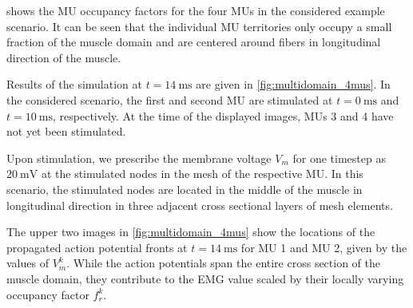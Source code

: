  shows the MU occupancy factors for the four MUs in the considered example scenario. It can be seen that the individual MU territories only occupy a small fraction of the muscle domain and are centered around fibers in longitudinal direction of the muscle.

Results of the simulation at $t=\SI{14}{\ms}$ are given in \cref{fig:multidomain_4mus}. In the considered scenario, the first and second MU are stimulated at $t=\SI{0}{\ms}$ and $t=\SI{10}{\ms}$, respectively. At the time of the displayed images, MUs 3 and 4 have not yet been stimulated. 

Upon stimulation, we prescribe the membrane voltage $V_m$ for one timestep as $\SI{20}{\milli\volt}$ at the stimulated nodes in the mesh of the respective MU. In this scenario, the stimulated nodes are located in the middle of the muscle in longitudinal direction in three adjacent cross sectional layers of mesh elements.

The upper two images in \cref{fig:multidomain_4mus} show the locations of the propagated action potential fronts at $t=\SI{14}{\ms}$ for MU 1 and MU 2, given by the values of $V_m^k$. While the action potentials span the entire cross section of the muscle domain, they contribute to the EMG value scaled by their locally varying occupancy factor $f_r^k$.

